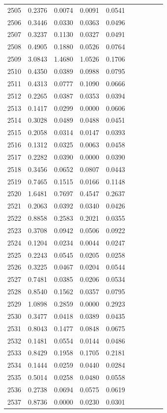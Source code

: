 \begin{table}
\begin{tabular}{cccccccccc}
2505& 0.2376& 0.0074& 0.0091& 0.0541\\ 
2506& 0.3446& 0.0330& 0.0363& 0.0496\\ 
2507& 0.3237& 0.1130& 0.0327& 0.0491\\ 
2508& 0.4905& 0.1880& 0.0526& 0.0764\\ 
2509& 3.0843& 1.4680& 1.0526& 0.1706\\ 
2510& 0.4350& 0.0389& 0.0988& 0.0795\\ 
2511& 0.4313& 0.0777& 0.1090& 0.0666\\ 
2512& 0.2265& 0.0387& 0.0353& 0.0394\\ 
2513& 0.1417& 0.0299& 0.0000& 0.0606\\ 
2514& 0.3028& 0.0489& 0.0488& 0.0451\\ 
2515& 0.2058& 0.0314& 0.0147& 0.0393\\ 
2516& 0.1312& 0.0325& 0.0063& 0.0458\\ 
2517& 0.2282& 0.0390& 0.0000& 0.0390\\ 
2518& 0.3456& 0.0652& 0.0807& 0.0443\\ 
2519& 0.7465& 0.1515& 0.0166& 0.1148\\ 
2520& 1.6481& 0.7697& 0.4547& 0.2637\\ 
2521& 0.2063& 0.0392& 0.0340& 0.0426\\ 
2522& 0.8858& 0.2583& 0.2021& 0.0355\\ 
2523& 0.3708& 0.0942& 0.0506& 0.0922\\ 
2524& 0.1204& 0.0234& 0.0044& 0.0247\\ 
2525& 0.2243& 0.0545& 0.0205& 0.0258\\ 
2526& 0.3225& 0.0467& 0.0204& 0.0544\\ 
2527& 0.7481& 0.0385& 0.0206& 0.0534\\ 
2528& 0.8540& 0.1562& 0.0357& 0.0795\\ 
2529& 1.0898& 0.2859& 0.0000& 0.2923\\ 
2530& 0.3477& 0.0418& 0.0389& 0.0435\\ 
2531& 0.8043& 0.1477& 0.0848& 0.0675\\ 
2532& 0.1481& 0.0554& 0.0144& 0.0486\\ 
2533& 0.8429& 0.1958& 0.1705& 0.2181\\ 
2534& 0.1444& 0.0259& 0.0440& 0.0284\\ 
2535& 0.5014& 0.0258& 0.0480& 0.0558\\ 
2536& 0.2738& 0.0694& 0.0575& 0.0619\\ 
2537& 0.8736& 0.0000& 0.0230& 0.0301\\ 

\end{tabular}
\end{table}

